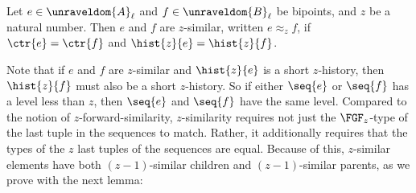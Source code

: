 \begin{definition}
 Let $e \in \unraveldom{A}_{\ell}$ and $f \in \unraveldom{B}_{\ell}$ be bipoints, and $z$ be a natural number. Then $e$ and $f$ are $z$-similar, written $e \approx_{z} f$, if $\ctr{e} = \ctr{f}$ and $\hist{z}{e} = \hist{z}{f}$.
\end{definition}
Note that if $e$ and $f$ are $z$-similar and $\hist{z}{e}$ is a short $z$-history, then $\hist{z}{f}$ must also be a short $z$-history.
So if either $\seq{e}$ or $\seq{f}$ has a level less than $z$, then $\seq{e}$ and $\seq{f}$ have the same level.
Compared to the notion of $z$-forward-similarity, $z$-similarity requires not just the $\FGF_{z}$-type of the last tuple in the sequences to match.
Rather, it additionally requires that the types of the $z$ last tuples of the sequences are equal.
Because of this, $z$-similar elements have both $(z{-}1)$-similar children and $(z{-}1)$-similar parents, as we prove with the next lemma:


